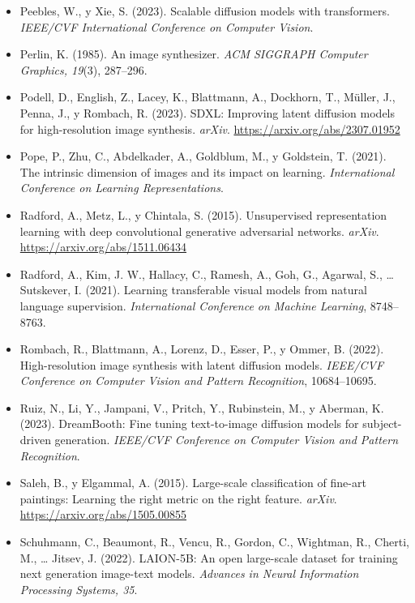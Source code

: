 \documentclass[12pt, a4paper, twoside]{book}
\begin{document}
\begin{itemize}[leftmargin=1.5em, itemsep=4pt]
\item Peebles, W., y Xie, S. (2023). Scalable diffusion models with transformers. \textit{IEEE/CVF International Conference on Computer Vision}.

\item Perlin, K. (1985). An image synthesizer. \textit{ACM SIGGRAPH Computer Graphics, 19}(3), 287--296.

\item Podell, D., English, Z., Lacey, K., Blattmann, A., Dockhorn, T., M{\"u}ller, J., Penna, J., y Rombach, R. (2023). SDXL: Improving latent diffusion models for high-resolution image synthesis. \textit{arXiv}. \url{https://arxiv.org/abs/2307.01952}

\item Pope, P., Zhu, C., Abdelkader, A., Goldblum, M., y Goldstein, T. (2021). The intrinsic dimension of images and its impact on learning. \textit{International Conference on Learning Representations}.

\item Radford, A., Metz, L., y Chintala, S. (2015). Unsupervised representation learning with deep convolutional generative adversarial networks. \textit{arXiv}. \url{https://arxiv.org/abs/1511.06434}

\item Radford, A., Kim, J. W., Hallacy, C., Ramesh, A., Goh, G., Agarwal, S., \ldots{} Sutskever, I. (2021). Learning transferable visual models from natural language supervision. \textit{International Conference on Machine Learning}, 8748--8763.

\item Rombach, R., Blattmann, A., Lorenz, D., Esser, P., y Ommer, B. (2022). High-resolution image synthesis with latent diffusion models. \textit{IEEE/CVF Conference on Computer Vision and Pattern Recognition}, 10684--10695.

\item Ruiz, N., Li, Y., Jampani, V., Pritch, Y., Rubinstein, M., y Aberman, K. (2023). DreamBooth: Fine tuning text-to-image diffusion models for subject-driven generation. \textit{IEEE/CVF Conference on Computer Vision and Pattern Recognition}.

\item Saleh, B., y Elgammal, A. (2015). Large-scale classification of fine-art paintings: Learning the right metric on the right feature. \textit{arXiv}. \url{https://arxiv.org/abs/1505.00855}

\item Schuhmann, C., Beaumont, R., Vencu, R., Gordon, C., Wightman, R., Cherti, M., \ldots{} Jitsev, J. (2022). LAION-5B: An open large-scale dataset for training next generation image-text models. \textit{Advances in Neural Information Processing Systems, 35}.


\end{itemize}
\end{document}
